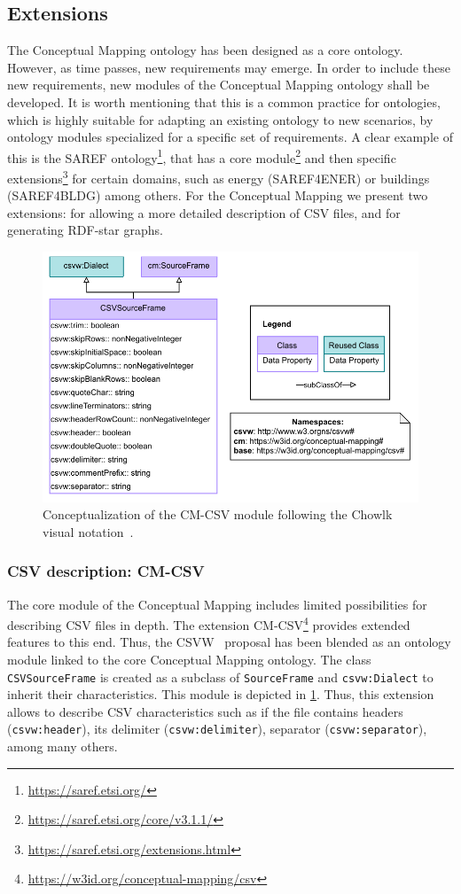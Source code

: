 \subsection{Extensions}
\label{sec:chp4_cm-extensions}
The Conceptual Mapping ontology has been designed as a core ontology. However, as time passes, new requirements may emerge. In order to include these new requirements, new modules of the Conceptual Mapping ontology shall be developed. It is worth mentioning that this is a common practice for ontologies, which is highly suitable for adapting an existing ontology to new scenarios, by ontology modules specialized for a specific set of requirements. A clear example of this is the SAREF ontology\footnote{\url{https://saref.etsi.org/}}, that has a core module\footnote{\url{https://saref.etsi.org/core/v3.1.1/}} and then specific extensions\footnote{\url{https://saref.etsi.org/extensions.html}} for certain domains, such as energy (SAREF4ENER) or buildings (SAREF4BLDG) among others. For the Conceptual Mapping we present two extensions: for allowing a more detailed description of CSV files, and for generating RDF-star graphs.


\begin{figure}[!t]
\centering
\includegraphics[width=0.8\linewidth]{figures/chp4-2_cm-csv.pdf}
\caption[CM-CSV module]{Conceptualization of the CM-CSV module following the Chowlk visual notation~\cite{feria2022chowlk}.}
\label{fig:chp4-2_cm-csv}
\end{figure}


\subsubsection{CSV description: CM-CSV}
The core module of the Conceptual Mapping includes limited possibilities for describing CSV files in depth. The extension CM-CSV\footnote{\url{https://w3id.org/conceptual-mapping/csv}} provides extended features to this end. Thus, the CSVW~\cite{Tennison2015csvw} proposal has been blended as an ontology module linked to the core Conceptual Mapping ontology. The class \texttt{CSVSourceFrame} is created as a subclass of \texttt{SourceFrame} and \texttt{csvw:Dialect} to inherit their characteristics. This module is depicted in \cref{fig:chp4-2_cm-csv}. Thus, this extension allows to describe CSV characteristics such as if the file contains headers (\texttt{csvw:header}), its delimiter (\texttt{csvw:delimiter}), separator (\texttt{csvw:separator}), among many others. 

